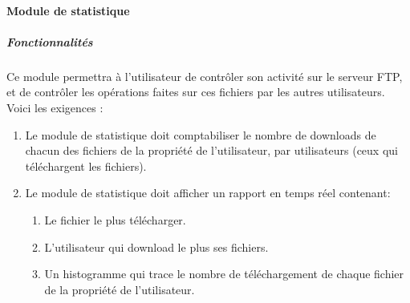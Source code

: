 \documentclass[10pt,a4paper]{report}
\begin{document}
\paragraph{Module de statistique}

	\subparagraph{Fonctionnalités}

	Ce module permettra à l'utilisateur de contrôler son activité sur le serveur FTP, et de contrôler les opérations faites sur ces fichiers par les autres utilisateurs.\\

	Voici les exigences :
		\begin{enumerate}

			\item Le module de statistique doit comptabiliser le nombre de downloads de chacun des fichiers de la propriété de l'utilisateur, par utilisateurs (ceux qui téléchargent les fichiers).

			\item Le module de statistique doit afficher un rapport en temps réel contenant: 

			\begin{enumerate}
				\item Le fichier le plus télécharger.
				\item L'utilisateur qui download le plus ses fichiers.
				\item Un histogramme qui trace le nombre de téléchargement de chaque fichier de la propriété de l'utilisateur.
			\end{enumerate} 
		\end{enumerate}
\end{document}
